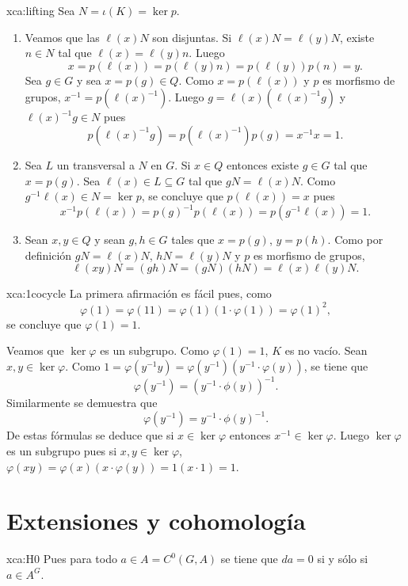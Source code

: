 \begin{sol}{xca:lifting}
	Sea $N=\iota(K)=\ker p$. 
	\begin{enumerate}
		\item Veamos que las $\ell(x)N$ son disjuntas. 
			Si $\ell(x)N=\ell(y)N$, existe $n\in N$ tal que
			$\ell(x)=\ell(y)n$. Luego 
			\[
			x=p(\ell(x))=p(\ell(y)n)=p(\ell(y))p(n)=y.
			\]
			Sea $g\in G$ y sea $x=p(g)\in Q$. Como $x=p(\ell(x))$ y $p$ es
			morfismo de grupos, $x^{-1}=p(\ell(x)^{-1})$. Luego
			$g=\ell(x)\left(\ell(x)^{-1}g\right)$ y $\ell(x)^{-1}g\in N$ pues
			\[
			p(\ell(x)^{-1}g)=p(\ell(x)^{-1})p(g)=x^{-1}x=1.
			\]
		\item Sea $L$ un transversal a $N$ en $G$. Si $x\in Q$ entonces existe
			$g\in G$ tal que $x=p(g)$.  Sea $\ell(x)\in L\subseteq G$ tal que
			$gN=\ell(x)N$. Como $g^{-1}\ell(x)\in N=\ker p$, se concluye que
			$p(\ell(x))=x$ pues 
			\[
			x^{-1}p(\ell(x))=p(g)^{-1}p(\ell(x))=p(g^{-1}\ell(x))=1.
			\]
		\item Sean $x,y\in Q$ y sean $g,h\in G$ tales que $x=p(g)$, $y=p(h)$. 
			Como por definición $gN=\ell(x)N$, $hN=\ell(y)N$ y $p$ es morfismo de grupos, 
			\[
				\ell(xy)N=(gh)N=(gN)(hN)=\ell(x)\ell(y)N.
			\]
	\end{enumerate}
\end{sol}


\begin{sol}{xca:1cocycle}
	La primera afirmación es fácil pues, como 
	\[
		\varphi(1)=\varphi(11)=\varphi(1)(1\cdot \varphi(1))=\varphi(1)^2,
	\]
	se concluye que $\varphi(1)=1$. 
	
	Veamos que $\ker\varphi$ es un subgrupo. 
	Como $\varphi(1)=1$, $K$ es no vacío. Sean
	$x,y\in \ker\varphi$. Como $1=\varphi(y^{-1}y)=\varphi(y^{-1})(y^{-1}\cdot
	\varphi(y))$, se tiene que
	\[
	\varphi(y^{-1})=(y^{-1}\cdot\phi(y))^{-1}.
	\]
	Similarmente se demuestra que 
	\[
		\varphi(y^{-1})=y^{-1}\cdot\phi(y)^{-1}.
	\]
	De estas fórmulas se deduce que si $x\in \ker\varphi$ entonces
	$x^{-1}\in \ker\varphi$. Luego $\ker\varphi$ es un subgrupo pues si $x,y\in \ker\varphi$, 
	$\varphi(xy)=\varphi(x)(x\cdot \varphi(y))=1(x\cdot 1)=1$. 
\end{sol}

\section*{Extensiones y cohomología}

\begin{sol}{xca:H0}
	Pues para todo $a\in A=C^0(G,A)$ se tiene que $da=0$ si y sólo si $a\in
	A^G$.
\end{sol}

